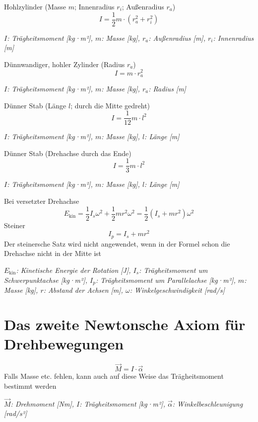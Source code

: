 \documentclass[a4paper,10pt]{article}
\newenvironment{displayformula}
{
	\begin{framed}
		\color{formulaColor}
	}
	{\end{framed}}
\newcommand{\formulalegend}[1]{%
	\par\vspace{0.5ex}%
	{{\color{legendColor}\RaggedRight\small\textit{#1}}}%
	\par\vspace{1.5ex}%
}
\begin{document}
\begin{displayformula}
	Hohlzylinder (Masse \( m \); Innenradius \( r_i \); Außenradius \( r_a \))
	\[
	I = \frac{1}{2} m \cdot (r_a^2 + r_i^2)
	\]
\end{displayformula}
\formulalegend{
	\( I \): Trägheitsmoment [kg·m²], \( m \): Masse [kg], \( r_a \): Außenradius [m], \( r_i \): Innenradius [m]
}

\begin{displayformula}
	Dünnwandiger, hohler Zylinder (Radius \( r_a \))
	\[
	I = m \cdot r_a^2
	\]
\end{displayformula}
\formulalegend{
	\( I \): Trägheitsmoment [kg·m²], \( m \): Masse [kg], \( r_a \): Radius [m]
}

\begin{displayformula}
	Dünner Stab (Länge \( l \); durch die Mitte gedreht)
	\[
	I = \frac{1}{12} m \cdot l^2
	\]
\end{displayformula}
\formulalegend{
	\( I \): Trägheitsmoment [kg·m²], \( m \): Masse [kg], \( l \): Länge [m]
}

\begin{displayformula}
	Dünner Stab (Drehachse durch das Ende)
	\[
	I = \frac{1}{3} m \cdot l^2
	\]
\end{displayformula}
\formulalegend{
	\( I \): Trägheitsmoment [kg·m²], \( m \): Masse [kg], \( l \): Länge [m]
}

\begin{displayformula}
	Bei versetzter Drehachse
	\[
	E_{\text{kin}} = \frac{1}{2} I_s \omega^2 + \frac{1}{2} m r^2 \omega^2 = \frac{1}{2} (I_s + m r^2) \omega^2
	\]
	Steiner
	\[
	I_p = I_s + m r^2
	\]
	Der steinersche Satz wird nicht angewendet, wenn in der Formel schon die Drehachse nicht in der Mitte ist
\end{displayformula}
\formulalegend{
	\( E_{\text{kin}} \): Kinetische Energie der Rotation [J], \( I_s \): Trägheitsmoment um Schwerpunktachse [kg·m²], \( I_p \): Trägheitsmoment um Parallelachse [kg·m²], \( m \): Masse [kg], \( r \): Abstand der Achsen [m], \( \omega \): Winkelgeschwindigkeit [rad/s]
}

\section{Das zweite Newtonsche Axiom für Drehbewegungen}

\begin{displayformula}
	\[
	\vec{M} = I \cdot \vec{\alpha}
	\]
	Falls Masse etc. fehlen, kann auch auf diese Weise das Trägheitsmoment bestimmt werden
\end{displayformula}
\formulalegend{
	\( \vec{M} \): Drehmoment [Nm], \( I \): Trägheitsmoment [kg·m²], \( \vec{\alpha} \): Winkelbeschleunigung [rad/s²]
}
\end{document}
